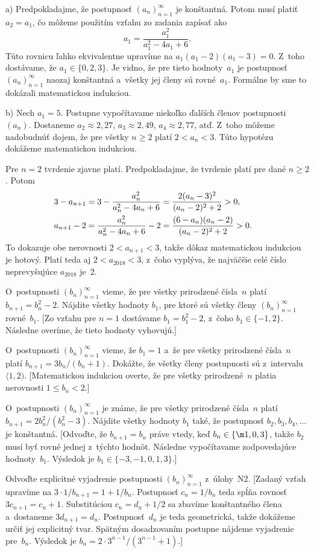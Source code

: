 ﻿{%
\def\a{(a_n)_{n=1}^\infty}%
\def\b{(b_n)_{n=1}^\infty}%
a) Predpokladajme, že postupnosť $\a$ je konštantná. Potom
musí platiť $a_2 = a_1$, čo môžeme použitím vzťahu zo zadania
zapísať ako
$$
a_1 = \frac {a_1^2}{a_1^2-4a_1+6}.
$$
Túto rovnicu ľahko ekvivalentne upravíme na $a_1(a_1-2)(a_1-3) = 0$.
Z~toho dostávame, že $a_1 \in \{0, 2, 3\}$. Je vidno, že pre tieto
hodnoty~$a_1$ je postupnosť $\a$ naozaj konštantná a~všetky jej
členy sú rovné~$a_1$. Formálne by sme to dokázali matematickou
indukciou.

b) Nech $a_1 = 5$. Postupne vypočítavame niekoľko ďalších
členov postupnosti $(a_n)$. Dostaneme $a_2 \approx 2{,}27$, $a_3 \approx
2{,}49$, $a_4\approx 2{,}77$, atď. Z~toho môžeme nadobudnúť dojem,
že pre všetky $n \ge 2$ platí $2 <a_n <3$. Túto hypotézu
dokážeme matematickou indukciou.

Pre $n = 2$ tvrdenie zjavne platí. Predpokladajme, že tvrdenie platí pre dané
$n\ge 2$. Potom
$$
\aligned
3-a_{n+1} &= 3- \frac {a_n^2}{a_n^2-4a_n+6} =\frac {2 (a_n-3)^2}{(a_n-2)^2+2}> 0, \cr
a_{n+1}-2 &= \frac {a_n^2}{a_n^2-4a_n+6}-2 =\frac {(6-a_n) (a_n-2)}{(a_n-2)^2+2}> 0.
\endaligned
$$
To dokazuje obe nerovnosti $2 <a_{n+1} <3$, takže dôkaz matematickou
indukciou je hotový. Platí teda aj $2 <a_{2018} <3$, z~čoho
vyplýva, že najväčšie celé číslo neprevyšujúce $a_{2018}$ je~2.


O~postupnosti $\b$ vieme, že pre všetky prirodzené
čísla~$n$ platí $b_{n+1} = b_n^2-2$. Nájdite všetky hodnoty $b_1$,
pre ktoré sú všetky členy $\b$ rovné~$b_1$.
[Zo vzťahu pre $n = 1$
dostávame $b_1 = b_1^2-2$, z~čoho $b_1\in \{- 1, 2\}$. Následne overíme,
že tieto hodnoty vyhovujú.]

O~postupnosti $\b$ vieme, že $b_1 = 1$ a~že pre všetky
prirodzené čísla~$n$ platí $b_{n+1} = 3b_n / (b_n+1)$. Dokážte, že
všetky členy postupnosti sú z~intervalu $\langle1, 2)$.
[Matematickou indukciou overte, že pre všetky prirodzené~$n$ platia
nerovnosti $1\le b_n <2$.]

\D
O~postupnosti $\b$ je známe, že pre všetky prirodzené
čísla~$n$ platí $b_{n+1} = 2b_n^2 / (b_n^2-3)$. Nájdite všetky hodnoty
$b_1$ také, že postupnosť $b_2, b_3, b_4, \dots$ je konštantná.
[Odvoďte, že $b_{n+1} = b_n$ práve vtedy, keď $b_n \in \{\m1, 0, 3\}$, takže
$b_2$ musí byť rovné jednej z~týchto hodnôt. Následne
vypočítavame zodpovedajúce hodnoty~$b_1$. Výsledok je $b_1 \in
\{{-3},\allowbreak{-1}, 0, 1, 3\}$.]

Odvoďte explicitné vyjadrenie postupnosti $\b$ z~úlohy~N2.
[Zadaný vzťah upravíme na $3 \cdot 1 / b_{n+1} = 1+1 / b_n$.
Postupnosť $c_n = 1 / b_n$ teda spĺňa rovnosť $3c_{n+1} = c_n+1$. Substitúciou
$c_n = d_n+1/2$ sa zbavíme konštantného člena a~dostaneme
$3d_{n+1} = d_n$. Postupnosť~$d_n$ je teda geometrická, takže dokážeme
určiť jej explicitný tvar. Spätným dosadzovaním postupne
nájdeme vyjadrenie pre~$b_n$. Výsledok je $b_n = 2 \cdot 3^{n-1} /
(3^{n-1}+1)$.]

}
